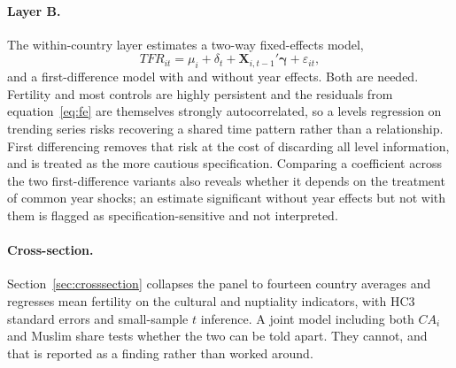 \paragraph{Layer B.} The within-country layer estimates a two-way fixed-effects model,
\begin{equation}
TFR_{it} = \mu_i + \delta_t + \mathbf{X}_{i,t-1}'\boldsymbol{\gamma} + \varepsilon_{it},
\label{eq:fe}
\end{equation}
and a first-difference model with and without year effects. Both are needed. Fertility and most controls are highly persistent and the residuals from equation~\eqref{eq:fe} are themselves strongly autocorrelated, so a levels regression on trending series risks recovering a shared time pattern rather than a relationship. First differencing removes that risk at the cost of discarding all level information, and is treated as the more cautious specification. Comparing a coefficient across the two first-difference variants also reveals whether it depends on the treatment of common year shocks; an estimate significant without year effects but not with them is flagged as specification-sensitive and not interpreted.

\paragraph{Cross-section.} Section~\ref{sec:crosssection} collapses the panel to fourteen country averages and regresses mean fertility on the cultural and nuptiality indicators, with HC3 standard errors and small-sample $t$ inference. A joint model including both $CA_i$ and Muslim share tests whether the two can be told apart. They cannot, and that is reported as a finding rather than worked around.

